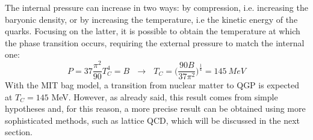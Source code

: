 The internal pressure can increase in two ways: by compression, i.e. increasing the baryonic density, or by increasing the temperature, i.e the kinetic energy of the quarks. Focusing on the latter, it is possible to obtain the temperature at which the phase transition occurs, requiring the external pressure to match the internal one: 
%
\begin{equation}
  P = 37 \frac{\pi^{2}}{90}T^{4}_{C} = B \ \ \ \longrightarrow \ \ \ T_{C} = \Big(\frac{90B}{37\pi^{2}}\Big)^{\frac{1}{4}}= 145 \ MeV
\end{equation}
%
With the MIT bag model, a transition from nuclear matter to QGP is expected at $T_{C} = 145$ MeV. However, as already said, this result comes from simple hypotheses and, for this reason, a more precise result can be obtained using more sophisticated methods, such as lattice QCD, which will be discussed in the next section.
%

